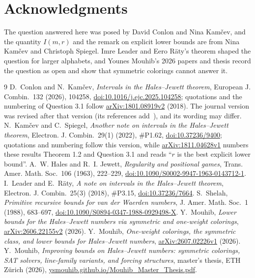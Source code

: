 \documentclass[11pt]{article}
\theoremstyle{remark}
\begin{document}
\section*{Acknowledgments}
The question answered here was posed by David Conlon and Nina Kamčev, and the quantity $I(m,r)$ and the remark on explicit lower bounds are from Nina Kamčev and Christoph Spiegel. Imre Leader and Eero Räty's theorem shaped the question for larger alphabets, and Younes Mouhib's 2026 papers and thesis record the question as open and show that symmetric colorings cannot answer it.

\begin{thebibliography}{9}
 D.~Conlon and N.~Kamčev, \emph{Intervals in the Hales--Jewett theorem}, European J. Combin.\ 132 (2026), 104258, \href{https://doi.org/10.1016/j.ejc.2025.104258}{doi:10.1016/j.ejc.2025.104258}; quotations and the numbering of Question 3.1 follow \href{https://arxiv.org/abs/1801.08919v2}{arXiv:1801.08919v2} (2018). The journal version was revised after that version (its references add~\cite{KS}), and its wording may differ.
 N.~Kamčev and C.~Spiegel, \emph{Another note on intervals in the Hales--Jewett theorem}, Electron. J. Combin.\ 29(1) (2022), \#P1.62, \href{https://doi.org/10.37236/9400}{doi:10.37236/9400}; quotations and numbering follow this version, while \href{https://arxiv.org/abs/1811.04628v1}{arXiv:1811.04628v1} numbers these results Theorem 1.2 and Question 3.1 and reads ``$r$ is the best explicit lower bound''.
 A.~W. Hales and R.~I. Jewett, \emph{Regularity and positional games}, Trans. Amer. Math. Soc.\ 106 (1963), 222--229, \href{https://doi.org/10.1090/S0002-9947-1963-0143712-1}{doi:10.1090/S0002-9947-1963-0143712-1}.
 I.~Leader and E.~Räty, \emph{A note on intervals in the Hales--Jewett theorem}, Electron. J. Combin.\ 25(3) (2018), \#P3.15, \href{https://doi.org/10.37236/7664}{doi:10.37236/7664}.
 S.~Shelah, \emph{Primitive recursive bounds for van der Waerden numbers}, J. Amer. Math. Soc.\ 1 (1988), 683--697, \href{https://doi.org/10.1090/S0894-0347-1988-0929498-X}{doi:10.1090/S0894-0347-1988-0929498-X}.
 Y.~Mouhib, \emph{Lower bounds for the Hales--Jewett numbers via symmetric and one-weight colorings}, \href{https://arxiv.org/abs/2606.22155v2}{arXiv:2606.22155v2} (2026).
 Y.~Mouhib, \emph{One-weight colorings, the symmetric class, and lower bounds for Hales--Jewett numbers}, \href{https://arxiv.org/abs/2607.02226v1}{arXiv:2607.02226v1} (2026).
 Y.~Mouhib, \emph{Improving bounds on Hales--Jewett numbers: symmetric colorings, SAT solvers, line-family variants, and forcing structures}, master's thesis, ETH Zürich (2026), \href{https://ysmouhib.github.io/Mouhib_Master_Thesis.pdf}{ysmouhib.github.io/Mouhib\_Master\_Thesis.pdf}.
\end{thebibliography}
\end{document}
